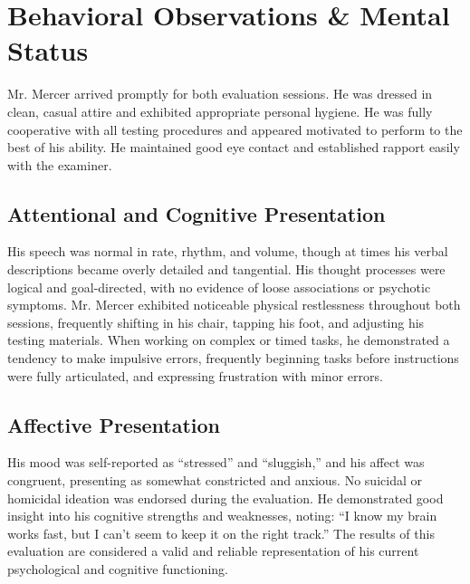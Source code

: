 \section{Behavioral Observations \& Mental Status}

Mr. Mercer arrived promptly for both evaluation sessions. He was dressed in clean, casual attire and exhibited appropriate personal hygiene. He was fully cooperative with all testing procedures and appeared motivated to perform to the best of his ability. He maintained good eye contact and established rapport easily with the examiner.

\subsection{Attentional and Cognitive Presentation}
His speech was normal in rate, rhythm, and volume, though at times his verbal descriptions became overly detailed and tangential. His thought processes were logical and goal-directed, with no evidence of loose associations or psychotic symptoms. Mr. Mercer exhibited noticeable physical restlessness throughout both sessions, frequently shifting in his chair, tapping his foot, and adjusting his testing materials. When working on complex or timed tasks, he demonstrated a tendency to make impulsive errors, frequently beginning tasks before instructions were fully articulated, and expressing frustration with minor errors.

\subsection{Affective Presentation}
His mood was self-reported as ``stressed'' and ``sluggish,'' and his affect was congruent, presenting as somewhat constricted and anxious. No suicidal or homicidal ideation was endorsed during the evaluation. He demonstrated good insight into his cognitive strengths and weaknesses, noting: ``I know my brain works fast, but I can't seem to keep it on the right track.'' The results of this evaluation are considered a valid and reliable representation of his current psychological and cognitive functioning.
